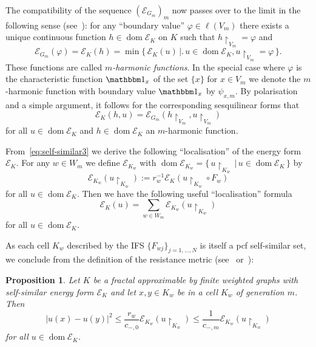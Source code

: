 \documentclass[12pt,reqno,a4paper]{amsart}            %
\numberwithin{equation}{section}
\theoremstyle{mythmstyle}       %
\newtheorem{proposition}[theorem]{Proposition}
\theoremstyle{mydefstyle}        %
\newcommand{\bigabssqr}[2][{}]{\bigl\lvert{#2}\bigr\rvert^2_{#1}}%
\newcommand{\set}[2]{\{ \, #1 \, | \, #2 \, \} }      %
\newcommand{\bigset}[2]{\bigl\{ \, #1 \, \bigl|\bigr. \, #2 \, \bigr\} }
\newcommand{\restr}[1]{{\restriction}_{#1}} %
\DeclareMathOperator{\dom}    {dom}
\renewcommand{\phi}{\varphi}   %
\newcommand{\1}{\mathbbm 1}                    %
\newcommand{\lsymb}    {\ell}          %
\newcommand{\energy}{\mathcal E}
\newcommand{\conductance}{c}  %
\newcommand{\lspace}[1]{\lsymb({#1})}   %
\begin{document}
The compatibility of the sequence $(\energy_{G_m})_m$ now passes over to
the limit in the following sense (see~\cite[Lem.~2.2.2]{kigami:01}):
for any ``boundary value'' $\phi \in \lspace{V_m}$ there exists a
unique continuous function $h \in \dom \energy_K$ on $K$ such
that $h \restr{V_m}=\phi$ and
\begin{equation}
  \label{eq:harm.ext}
  \energy_{G_m}(\phi)=
  \energy_K(h)=
  \min \bigset {\energy_K(u)} {u \in \dom \energy_K, u \restr{V_m}=\phi}.
\end{equation}
These functions are called \emph{$m$-harmonic functions}. In the
special case where $\phi$ is the characteristic function $\1_x$ of the
set $\{x\}$ for $x\in V_m$ we denote the $m$-harmonic function with
boundary value $\1_x$ by $\psi_{x,m}$.  By polarisation and a simple
argument, it follows for the corresponding sesquilinear forms that
\begin{equation}
  \label{eq:harmonic}
  \energy_K(h, u)
  = \energy_{G_m}(h \restr{V_m}, u \restr{V_m})
\end{equation}
for all $u \in \dom \energy_K$ and $h \in \dom \energy_K$ an $m$-harmonic
function.

From~\eqref{eq:self-similar3} we derive the following ``localisation''
of the energy form $\energy_K$.  For any $w\in W_m$ we define
$\energy_{K_w}$ with $\dom \energy_{K_w}=\set{u \restr{K_w}}{u \in
  \dom \energy_K}$ by
\begin{equation}
  \label{eq:def.local.energy}
  \energy_{K_w}(u \restr{K_w})
  :=r_w^{-1} \energy_K(u \restr{K_w} \circ F_w)
\end{equation}
for all $u \in \dom \energy_K$.
Then we have the following useful ``localisation'' formula
\begin{equation}
  \label{eq:local.energy}
  \energy_K(u) 
  = \sum_{w \in W_m} \energy_{K_w}(u \restr{K_w})
\end{equation}
for all $u \in \dom \energy_K$.


As each cell $K_w$ described by the IFS $\{F_{wj}\}_{j=1,\dots,N}$ is
itself a pcf self-similar set, we conclude from the definition of the
resistance metric (see~\cite[Secs.~2.3]{kigami:01} or~\cite[Sec.~4.4
and~1.6]{strichartz:06}):
\begin{proposition}
  \label{prp:hoelder}
  Let $K$ be a fractal approximable by finite weighted graphs with
  self-similar energy form $\energy_K$ and let $x,y \in K_w$ be in a
  cell $K_w$ of generation $m$.  Then
  \begin{equation}
    \label{eq:hoelder-ineq}
    \bigabssqr{u(x)-u(y)}
    \le \frac {r_w}{\conductance_{-,0}} \energy_{K_w} (u \restr{K_w})
    \le \frac 1 {\conductance_{-,m}} \energy_{K_w} (u \restr{K_w})
  \end{equation}
  for all $u \in \dom \energy_K$.
\end{proposition}
\end{document}
